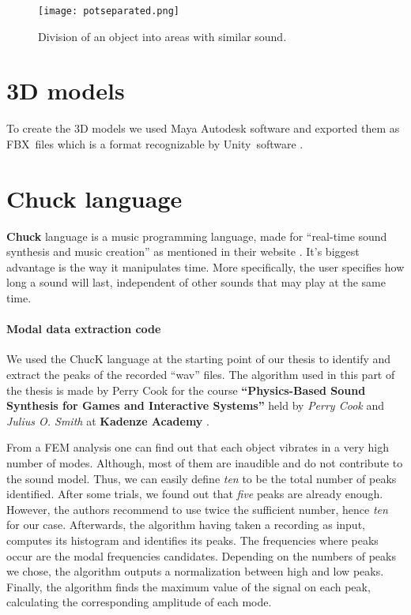 \begin{figure}[H]
  \centering
    \texttt{[image: potseparated.png]}
      \caption{Division of an object into areas with similar sound.}
      \label{fig:pot_sep}
\end{figure} 

\section{3D models}
To create the 3D models we used Maya Autodesk software \cite{bib:maya} and exported them as FBX\textregistered\ files \cite{bib:fbx} which is a format recognizable by Unity\textregistered\ software \cite{bib:unity}.

\section{Chuck language}
\textbf{Chuck} language is a music programming language, made for ``real-time sound synthesis and music creation'' as mentioned in their website \cite{bib:chuck}. It's biggest advantage is the way it manipulates time. More specifically, the user specifies how long a sound will last, independent of other sounds that may play at the same time.

\paragraph{Modal data extraction code\\}
We used the ChucK language at the starting point of our thesis to identify and extract the peaks of the recorded ``wav'' files. The algorithm used in this part of the thesis is made by Perry Cook for the course \textbf{``Physics-Based Sound Synthesis for Games and Interactive Systems''} held by \textit{Perry Cook} and \textit{Julius O. Smith} at \textbf{Kadenze Academy} \cite{bib:physicsbasedcourse}.

From a FEM analysis one can find out that each object vibrates in a very high number of modes. Although, most of them are inaudible and do not contribute to the sound model. Thus, we can easily define \textit{ten} to be the total number of peaks identified. After some trials, we found out that \textit{five} peaks are already enough. However, the authors recommend to use twice the sufficient number, hence \textit{ten} for our case. Afterwards, the algorithm having taken a recording as input, computes its histogram and identifies its peaks. The frequencies where peaks occur are the modal frequencies candidates. Depending on the numbers of peaks we chose, the algorithm outputs a normalization between high and low peaks. Finally, the algorithm finds the maximum value of the signal on each peak, calculating the corresponding amplitude of each mode.

